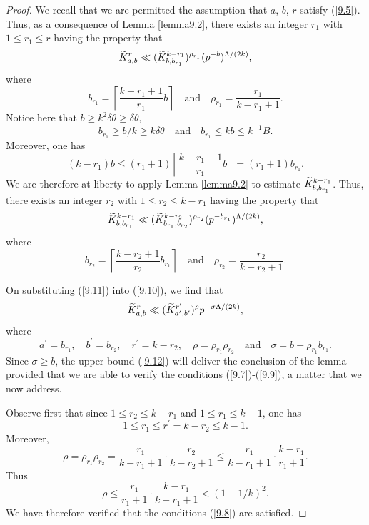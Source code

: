 \documentclass[12pt,reqno]{amsart}
\theoremstyle{definition}
\theoremstyle{remark}
\numberwithin{equation}{section}
\def\del{{\delta}} \def\Del{{\Delta}} \def\Deltil{{\widetilde \Delta}}
\def\tet{{\theta}} \def\bftet{{\boldsymbol \theta}}
\def\sig{{\sigma}} \def\Sig{{\Sigma}} \def\bfsig{{\boldsymbol \sig}}
\def\le{\leqslant} \def\ge{\geqslant} \def\pleq{\preccurlyeq} \def\ple{\prec}
\begin{document}
\begin{proof} We recall that we are permitted the assumption that $a$, $b$, $r$ satisfy 
(\ref{9.5}). Thus, as a consequence of Lemma \ref{lemma9.2}, there exists an integer 
$r_1$ with $1\le r_1\le r$ having the property that
\begin{equation}\label{9.10}
\widetilde K_{a,b}^r\ll (\widetilde K_{b,b_{r_1}}^{k-r_1})^{\rho_{r_1}}(p^{-b})^{{\Lambda}/(2k)},
\end{equation}
where
$$b_{r_1}=\left\lceil \frac{k-r_1+1}{r_1}b\right\rceil \quad \text{and}\quad \rho_{r_1}
=\frac{r_1}{k-r_1+1}.$$
Notice here that $b\ge k^2\del \tet\ge \del \tet$,
$$b_{r_1}\ge b/k\ge k\del \tet \quad \text{and}\quad b_{r_1}\le kb\le k^{-1}B.$$
Moreover, one has
$$(k-r_1)b\le (r_1+1)\left\lceil \frac{k-r_1+1}{r_1}b\right\rceil =(r_1+1)b_{r_1}.$$
We are therefore at liberty to apply Lemma \ref{lemma9.2} to estimate $\widetilde K_{b,b_{r_1}}
^{k-r_1}$.
Thus, there exists an integer $r_2$ with $1\le r_2\le k-r_1$ having the property that
\begin{equation}\label{9.11}
\widetilde K_{b,b_{r_1}}^{k-r_1}\ll (\widetilde K_{b_{r_1},b_{r_2}}^{k-r_2})^{\rho_{r_2}}
(p^{-b_{r_1}})^{{\Lambda}/(2k)},
\end{equation}
where
$$b_{r_2}=\left\lceil \frac{k-r_2+1}{r_2}b_{r_1}\right\rceil \quad \text{and}\quad 
\rho_{r_2}=\frac{r_2}{k-r_2+1}.$$

\par On substituting (\ref{9.11}) into (\ref{9.10}), we find that
\begin{equation}\label{9.12}
\Ktil_{a,b}^r\ll (\Ktil_{a^\prime,b^\prime}^{r^\prime})^\rho p^{-\sig \Lam/(2k)},
\end{equation}
where
$$a^\prime =b_{r_1},\quad b^\prime =b_{r_2},\quad r^\prime =k-r_2,\quad 
\rho=\rho_{r_1}\rho_{r_2}\quad \text{and}\quad \sig=b+\rho_{r_1}b_{r_1}.$$
Since $\sig\ge b$, the upper bound (\ref{9.12}) will deliver the conclusion of the lemma 
provided that we are able to verify the conditions (\ref{9.7})-(\ref{9.9}), a matter that 
we now address.\par

Observe first that since $1\le r_2\le k-r_1$ and $1\le r_1\le k-1$, one has
$$1\le r_1\le r^\prime =k-r_2\le k-1.$$
Moreover,
$$\rho=\rho_{r_1}\rho_{r_2}=\frac{r_1}{k-r_1+1}\cdot \frac{r_2}{k-r_2+1}\le 
\frac{r_1}{k-r_1+1}\cdot \frac{k-r_1}{r_1+1}.$$
Thus
$$\rho\le \frac{r_1}{r_1+1}\cdot \frac{k-r_1}{k-r_1+1}<(1-1/k)^2.$$
We have therefore verified that the conditions (\ref{9.8}) are satisfied.\par


\end{proof}
\end{document}
